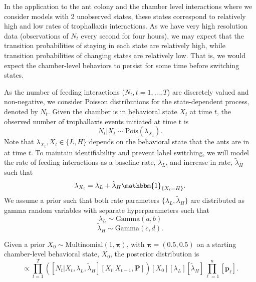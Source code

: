 \documentclass[cmbright,fleqn,referee]{envauth}
\begin{document}
In the application to the ant colony and the chamber level interactions where we consider models with 2 unobserved states, these states correspond to relatively high and low rates of trophallaxis interactions. As we have very high resolution data (observations of $N_t$ every second for four hours), we may expect that the transition probabilities of staying in each state are relatively high, while transition probabilities of changing states are relatively low. That is, we would expect the chamber-level behaviors to persist for some time before switching states. 

As the number of feeding interactions ($N_t, t = 1, \dots, T$) are discretely valued and non-negative, we consider Poisson distributions for the state-dependent process, denoted by $N_t$. Given the chamber is in behavioral state $X_t$ at time $t$, the observed number of trophallaxis events initiated at time t is
\begin{equation}
N_t | X_t \sim \text{Pois}(\lambda_{X_t}).
\label{e:NgivenX}
\end{equation}
Note that $\lambda_{X_t}, X_t \in \{L, H\}$ depends on the behavioral state that the ants are in at time $t$. To maintain identifiability and prevent label switching, we will model the rate of feeding interactions as a baseline rate, $\lambda_L$, and increase in rate, $\tilde{\lambda}_H$ such that
\begin{equation}
\lambda_{X_t} = \lambda_L + \tilde{\lambda}_H \mathbbm{1}_{\{X_t = H\}}.
\label{e:lambdasplit}
\end{equation}
We assume a prior such that both rate parameters $\{\lambda_L, \tilde{\lambda}_H\}$ are distributed as gamma random variables with separate hyperparameters such that
\begin{equation}
\lambda_L \sim \text{Gamma}(a, b)
\end{equation}
\begin{equation}
\tilde{\lambda}_H \sim \text{Gamma}(c, d).
\end{equation}


Given a prior $X_0 \sim \text{Multinomial}(1, \bm{\pi})$, with $\bm{\pi} = (0.5, 0.5)$ on a starting chamber-level behavioral state, $X_0$, the posterior distribution is
\begin{equation}
[\{X_t\}, \{\lambda_L, \tilde{\lambda}_H\}, \mathbf{P} | \{N_t\} ] \propto \prod_{t = 1}^T \left( [N_t | X_t, \lambda_L, \tilde{\lambda}_H] [X_t | X_{t-1}, \mathbf{P}] \right) [X_0][\lambda_L] [\tilde{\lambda}_H] \prod^n_{\ell = 1}[\mathbf{p}_\ell].
\end{equation}
\end{document}
